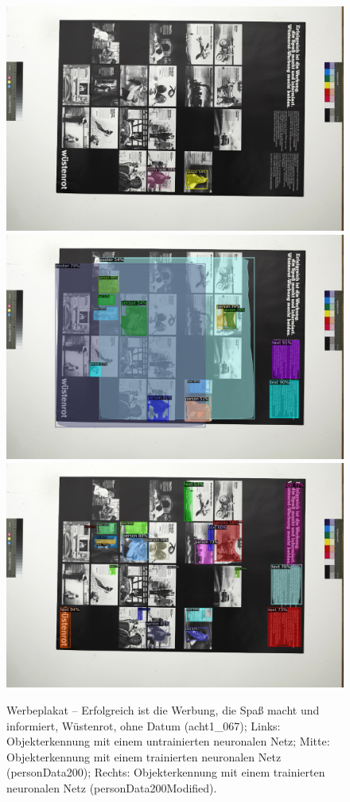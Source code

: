\documentclass[a4paper,12pt,ngerman]{article}
\begin{document}
\newpage
\begin{landscape}
\begin{figure}[ht]
	\centering
	\includegraphics[width=0.49\linewidth, angle=90]{Abbildung_65a_(acht1_067)_with_detections}
	\centering
	\includegraphics[width=0.49\linewidth, angle=90]{Abbildung_65b_(acht1_067)_with_detections}
	\centering
	\includegraphics[width=0.49\linewidth, angle=90]{Abbildung_65c_(acht1_067)_with_detections}
	\caption{Werbeplakat -- Erfolgreich ist die Werbung, die Spaß macht und informiert, Wüstenrot, ohne Datum (acht1\_067); Links: Objekterkennung mit einem untrainierten neuronalen Netz; Mitte: Objekterkennung mit einem trainierten neuronalen Netz (personData200); Rechts: Objekterkennung mit einem trainierten neuronalen Netz (personData200Modified).}
\end{figure}
\end{landscape}
\end{document}

